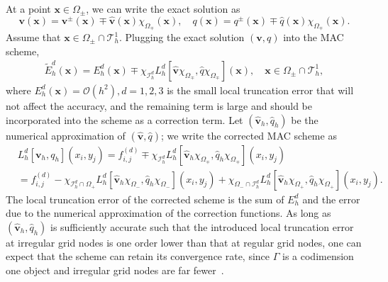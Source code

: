 \documentclass[preprint,11pt]{elsarticle}
\theoremstyle{remark}
\newcommand{\mc}[1]{\mathcal{#1}}
\newcommand{\wh}[1]{\widehat{#1}}
\newcommand{\wt}[1]{\widetilde{#1}}
\newcommand{\bm}[1]{\boldsymbol{#1}}
\begin{document}
At a point $\bm x \in \Omega_\pm$, we can write the exact solution as
\begin{equation}
    \bm v(\bm x) = \bm v^\pm(\bm x) \mp  \wh{\bm v}(\bm x) \chi_{\Omega_\mp}(\bm x), \quad  q(\bm x) =  q^\pm(\bm x) \mp  \wh q(\bm x)\chi_{\Omega_\mp}(\bm x).
\end{equation}
Assume that $\bm x\in\Omega_\pm \cap \mc T_h^1$.
Plugging the exact solution $(\bm v, q)$ into the MAC scheme, 
\begin{align}
    \wt E_h^d(\bm x) = E_h^d(\bm x) \mp  \chi_{ \mc I_h^d} L_h^d[\wh{\bm v}\chi_{\Omega_\mp}, \wh q\chi_{\Omega_\mp}](\bm x), \quad\bm x\in\Omega_\pm \cap \mc T_h^1,
\end{align}
where $E_h^d(\bm x) = \mc O(h^2), d=1,2,3$ is the small local truncation error that will not affect the accuracy, and the remaining term is large and should be incorporated into the scheme as a correction term.
Let $(\wh{\bm v}_h, \wh{q}_h)$ be the numerical approximation of $(\wh{\bm v}, \wh q)$; we write the corrected MAC scheme as
\begin{align}
    &L_h^d[\bm v_h, q_h](x_i,y_j) = f_{i,j}^{(d)}  \mp  \chi_{  \mc I_h^d} L_h^d[\wh{\bm v}_h\chi_{\Omega_\mp}, \wh q_h\chi_{\Omega_\mp}](x_i,y_j) \\
    &=f_{i,j}^{(d)}  - \chi_{ \mc I_h^d\cap\Omega_+} L_h^d[\wh{\bm v}_h\chi_{\Omega_-}, \wh q_h\chi_{\Omega_-}](x_i,y_j) +  \chi_{ \Omega_-\cap \mc I_h^d} L_h^d[\wh{\bm v}_h\chi_{\Omega_+}, \wh q_h\chi_{\Omega_+}](x_i,y_j) .
\end{align}
The local truncation error of the corrected scheme is the sum of $E_h^d$ and the error due to the numerical approximation of the correction functions. As long as $(\wh{\bm v}_h, \wh{q}_h)$ is sufficiently accurate such that the introduced local truncation error at irregular grid nodes is one order lower than that at regular grid nodes, one can expect that the scheme can retain its convergence rate, since $\Gamma$ is a codimension one object and irregular grid nodes are far fewer~\cite{Beale2006,Dong2023}.
\end{document}
